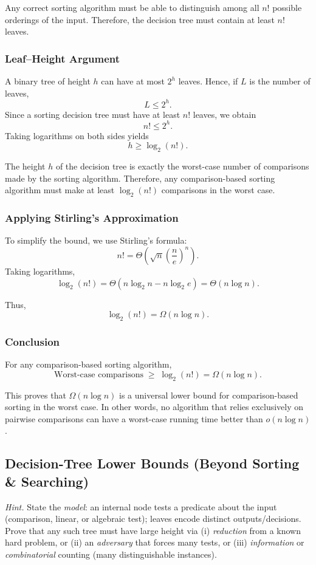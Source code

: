 \documentclass[9pt]{extarticle}
\begin{document}
Any correct sorting algorithm must be able to distinguish among all $n!$ possible 
orderings of the input.  
Therefore, the decision tree must contain at least $n!$ leaves.

\subsubsection*{Leaf–Height Argument}

A binary tree of height $h$ can have at most $2^h$ leaves.
Hence, if $L$ is the number of leaves,
\[
    L \le 2^h.
\]
Since a sorting decision tree must have at least $n!$ leaves, we obtain
\[
    n! \le 2^h.
\]
Taking logarithms on both sides yields
\[
    h \ge \log_2(n!).
\]

The height $h$ of the decision tree is exactly the worst-case number of comparisons made by the sorting
algorithm.  
Therefore, any comparison-based sorting algorithm must make at least
$\log_2(n!)$ comparisons in the worst case.

\subsubsection*{Applying Stirling’s Approximation}

To simplify the bound, we use Stirling's formula:
\[
    n! = \Theta\!\left( \sqrt{n}\left(\frac{n}{e}\right)^n \right).
\]
Taking logarithms,
\[
    \log_2(n!) 
    = \Theta\!\left( n \log_2 n - n \log_2 e \right)
    = \Theta(n \log n).
\]

Thus,
\[
    \log_2(n!) = \Omega(n \log n).
\]

\subsubsection*{Conclusion}

For any comparison-based sorting algorithm,
\[
    \text{Worst-case comparisons} \;\ge\; \log_2(n!) = \Omega(n \log n).
\]

This proves that $\Omega(n \log n)$ is a universal lower bound for 
comparison-based sorting in the worst case.  
In other words, no algorithm that relies exclusively on pairwise comparisons 
can have a worst-case running time better than $o(n \log n)$.

\subsection{Decision-Tree Lower Bounds (Beyond Sorting \& Searching)}
\textit{Hint.} State the \emph{model}: an internal node tests a predicate about the input (comparison, linear, or algebraic test); leaves encode distinct outputs/decisions. Prove that any such tree must have large height via (i) \emph{reduction} from a known hard problem, or (ii) an \emph{adversary} that forces many tests, or (iii) \emph{information} or \emph{combinatorial} counting (many distinguishable instances).
\end{document}
